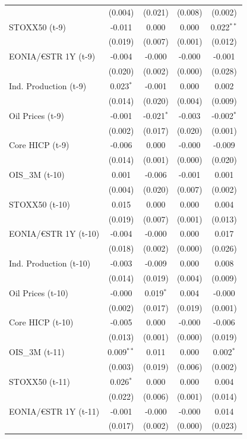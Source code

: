\begin{longtable}[t]{lcccc}
 & (0.004) & (0.021) & (0.008) & (0.002)\\
STOXX50 (t-9) & -0.011 & 0.000 & 0.000 & 0.022$^{**}$\\
 & (0.019) & (0.007) & (0.001) & (0.012)\\
EONIA/€STR 1Y (t-9) & -0.004 & -0.000 & -0.000 & -0.001\\
 & (0.020) & (0.002) & (0.000) & (0.028)\\
Ind. Production (t-9) & 0.023$^{*}$ & -0.001 & 0.000 & 0.002\\
 & (0.014) & (0.020) & (0.004) & (0.009)\\
Oil Prices (t-9) & -0.001 & -0.021$^{*}$ & -0.003 & -0.002$^{*}$\\
 & (0.002) & (0.017) & (0.020) & (0.001)\\
Core HICP (t-9) & -0.006 & 0.000 & -0.000 & -0.009\\
 & (0.014) & (0.001) & (0.000) & (0.020)\\
OIS\_3M (t-10) & 0.001 & -0.006 & -0.001 & 0.001\\
 & (0.004) & (0.020) & (0.007) & (0.002)\\
STOXX50 (t-10) & 0.015 & 0.000 & 0.000 & 0.004\\
 & (0.019) & (0.007) & (0.001) & (0.013)\\
EONIA/€STR 1Y (t-10) & -0.004 & -0.000 & 0.000 & 0.017\\
 & (0.018) & (0.002) & (0.000) & (0.026)\\
Ind. Production (t-10) & -0.003 & -0.009 & 0.000 & 0.008\\
 & (0.014) & (0.019) & (0.004) & (0.009)\\
Oil Prices (t-10) & -0.000 & 0.019$^{*}$ & 0.004 & -0.000\\
 & (0.002) & (0.017) & (0.019) & (0.001)\\
Core HICP (t-10) & -0.005 & 0.000 & -0.000 & -0.006\\
 & (0.013) & (0.001) & (0.000) & (0.019)\\
OIS\_3M (t-11) & 0.009$^{**}$ & 0.011 & 0.000 & 0.002$^{*}$\\
 & (0.003) & (0.019) & (0.006) & (0.002)\\
STOXX50 (t-11) & 0.026$^{*}$ & 0.000 & 0.000 & 0.004\\
 & (0.022) & (0.006) & (0.001) & (0.014)\\
EONIA/€STR 1Y (t-11) & -0.001 & -0.000 & -0.000 & 0.014\\
 & (0.017) & (0.002) & (0.000) & (0.023)\\

\end{longtable}
